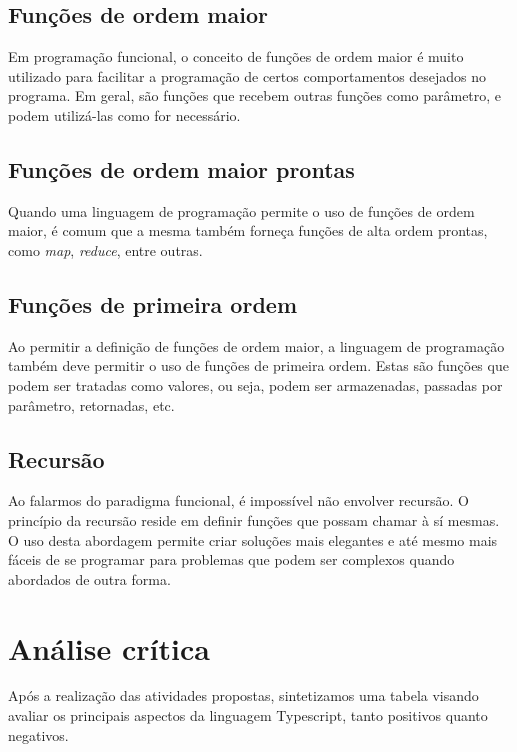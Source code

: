 \documentclass[rel_mlp]{iiufrgs}
\numberwithin{figure}{chapter}
\begin{document}
\section{Funções de ordem maior}

Em programação funcional, o conceito de funções de ordem maior é muito utilizado para facilitar a programação de certos comportamentos desejados no programa. Em geral, são funções que recebem outras funções como parâmetro, e podem utilizá-las como for necessário.


\section{Funções de ordem maior prontas}

Quando uma linguagem de programação permite o uso de funções de ordem maior, é comum que a mesma também forneça funções de alta ordem prontas, como \textit{map}, \textit{reduce}, entre outras. 


\section{Funções de primeira ordem}

Ao permitir a definição de funções de ordem maior, a linguagem de programação também deve permitir o uso de funções de primeira ordem. Estas são funções que podem ser tratadas como valores, ou seja, podem ser armazenadas, passadas por parâmetro, retornadas, etc.


\section{Recursão}

Ao falarmos do paradigma funcional, é impossível não envolver recursão. O princípio da recursão reside em definir funções que possam chamar à sí mesmas. O uso desta abordagem permite criar soluções mais elegantes e até mesmo mais fáceis de se programar para problemas que podem ser complexos quando abordados de outra forma.


%
\chapter{Análise crítica}

Após a realização das atividades propostas, sintetizamos uma tabela visando avaliar os principais aspectos da linguagem Typescript, tanto positivos quanto negativos.
\end{document}
